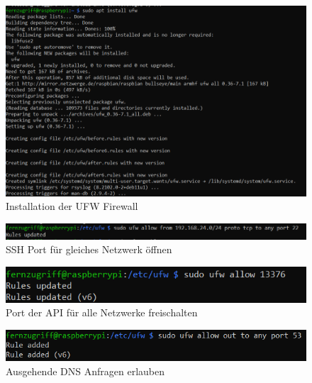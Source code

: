 \documentclass[a4paper, 11pt]{scrartcl}
\begin{document}
\begin{figure}[H]
    \begin{center}
        \includegraphics[scale=0.7]{Bilder/install_firewall.png}
        \caption{Installation der UFW Firewall}\label{pic:install_firewall}
    \end{center}
\end{figure}

\begin{figure}[H]
    \begin{center}
        \includegraphics[scale=0.7]{Bilder/allow_ssh_from_network.png}
        \caption{SSH Port für gleiches Netzwerk öffnen}\label{pic:ssh_port_allow}
    \end{center}
\end{figure}

\begin{figure}[H]
    \begin{center}
        \includegraphics[scale=0.7]{Bilder/ufw_allow_api.png}
        \caption{Port der API für alle Netzwerke freischalten}\label{pic:api_port_allow}
    \end{center}
\end{figure}

\begin{figure}[H]
    \begin{center}
        \includegraphics[scale=0.7]{Bilder/ufw_allow_out_dns.png}
        \caption{Ausgehende DNS Anfragen erlauben}\label{pic:dns_allow_out}
    \end{center}
\end{figure}
\end{document}
